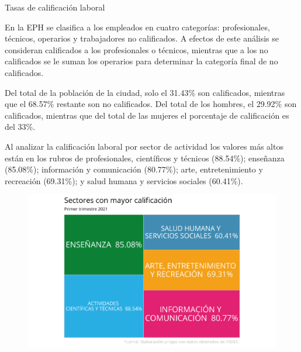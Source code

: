 \documentclass{article}
\begin{document}
\newpage
\textcolor{graycustom}{\Large Tasas de calificación laboral} \newline

En la EPH se clasifica a los empleados en cuatro categorías:
profesionales, técnicos, operarios y trabajadores no calificados. A
efectos de este análisis se consideran calificados a los profesionales o
técnicos, mientras que a los no calificados se le suman los operarios
para determinar la categoría final de no calificados.

Del total de la población de la ciudad, solo el 31.43\% son calificados,
mientras que el 68.57\% restante son no calificados. Del total de los
hombres, el 29.92\% son calificados, mientras que del total de las
mujeres el porcentaje de calificación es del 33\%.

Al analizar la calificación laboral por sector de actividad los valores
más altos están en los rubros de profesionales, científicos y técnicos
(88.54\%); enseñanza (85.08\%); información y comunicación (80.77\%);
arte, entretenimiento y recreación (69.31\%); y salud humana y servicios
sociales (60.41\%).
\begin{figure}
\includegraphics{Informe-Mercado-Laboral_files/figure-latex/unnamed-chunk-45-1.pdf}
\caption{} 
\end{figure}
\end{document}
